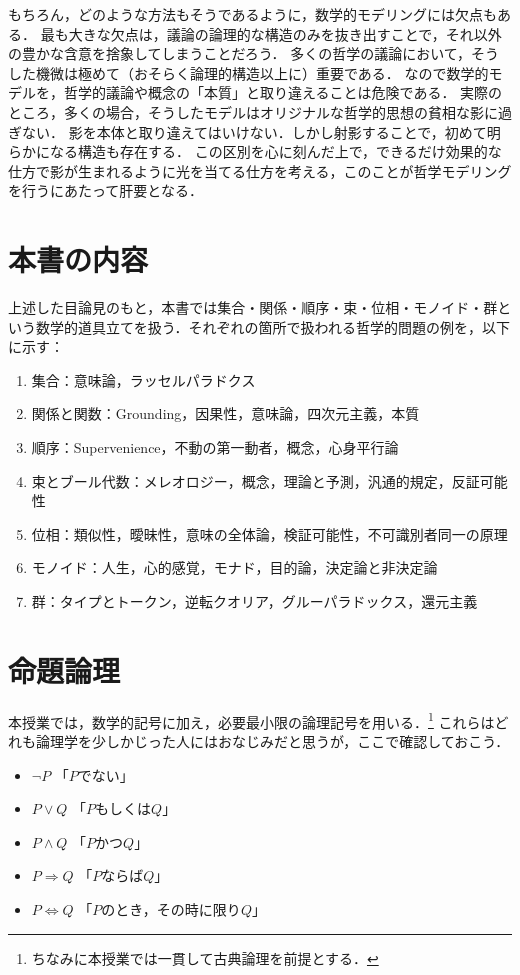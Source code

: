 \documentclass[11pt,a4paper]{jsarticle}
\begin{document}
もちろん，どのような方法もそうであるように，数学的モデリングには欠点もある．
最も大きな欠点は，議論の論理的な構造のみを抜き出すことで，それ以外の豊かな含意を捨象してしまうことだろう．
多くの哲学の議論において，そうした機微は極めて（おそらく論理的構造以上に）重要である．
なので数学的モデルを，哲学的議論や概念の「本質」と取り違えることは危険である．
実際のところ，多くの場合，そうしたモデルはオリジナルな哲学的思想の貧相な影に過ぎない．
影を本体と取り違えてはいけない．しかし射影することで，初めて明らかになる構造も存在する．
この区別を心に刻んだ上で，できるだけ効果的な仕方で影が生まれるように光を当てる仕方を考える，このことが哲学モデリングを行うにあたって肝要となる．


\section{本書の内容}
上述した目論見のもと，本書では集合・関係・順序・束・位相・モノイド・群という数学的道具立てを扱う．それぞれの箇所で扱われる哲学的問題の例を，以下に示す：
\begin{enumerate}
    \item 集合：意味論，ラッセルパラドクス
    \item 関係と関数：Grounding，因果性，意味論，四次元主義，本質
    \item 順序：Supervenience，不動の第一動者，概念，心身平行論
    \item 束とブール代数：メレオロジー，概念，理論と予測，汎通的規定，反証可能性
    \item 位相：類似性，曖昧性，意味の全体論，検証可能性，不可識別者同一の原理
    \item モノイド：人生，心的感覚，モナド，目的論，決定論と非決定論
    \item 群：タイプとトークン，逆転クオリア，グルーパラドックス，還元主義
\end{enumerate}


\section{命題論理}
本授業では，数学的記号に加え，必要最小限の論理記号を用いる．\footnote{ちなみに本授業では一貫して古典論理を前提とする．}
これらはどれも論理学を少しかじった人にはおなじみだと思うが，ここで確認しておこう．

\begin{itemize}
 \item $\neg P$ 「$P$でない」
 \item $P \vee Q$ 「$P$もしくは$Q$」
 \item $P \wedge Q$ 「$P$かつ$Q$」
 \item $P \Rightarrow Q$ 「$P$ならば$Q$」
 \item $P \iff Q$ 「$P$のとき，その時に限り$Q$」
\end{itemize}
\end{document}
